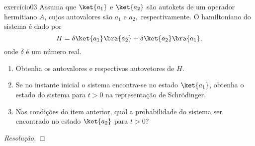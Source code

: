 \begin{exercício}{}{exercício03}
    Assuma que \(\ket{a_1}\) e \(\ket{a_2}\) são autokets de um operador hermitiano \(A\), cujos autovalores são \(a_1\) e \(a_2,\) respectivamente. O hamiltoniano do sistema é dado por
    \begin{equation*}
         H = \delta \ket{a_1}\bra{a_2} + \delta \ket{a_2}\bra{a_1},
    \end{equation*}
    onde \(\delta\) é um número real.
    \begin{enumerate}[label=(\alph*)]
        \item Obtenha os autovalores e respectivos autovetores de \(H\).
        \item Se no instante inicial o sistema encontra-se no estado \(\ket{a_1}\), obtenha o estado do sistema para \(t > 0\) na representação de Schrödinger.
        \item Nas condições do item anterior, qual a probabilidade do sistema ser encontrado no estado \(\ket{a_2}\) para \(t > 0\)?
    \end{enumerate}
\end{exercício}
\begin{proof}[Resolução]
    
\end{proof}
